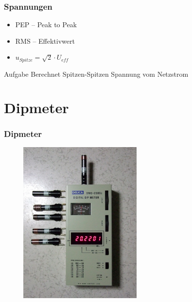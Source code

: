 \begin{frame}
  \frametitle{Spannungen}
  \begin{center}
    \begin{itemize}
      \item PEP -- Peak to Peak
      \item RMS -- Effektivwert
      \item $u_{Spitze} = \sqrt{2} \cdot U_{eff}$ \\
    \end{itemize}
  \end{center}
  \begin{exampleblock}{Aufgabe}
    Berechnet Spitzen-Spitzen Spannung vom Netzstrom
  \end{exampleblock}
\end{frame}

\section*{Dipmeter}

\begin{frame}
  \frametitle{Dipmeter}
  \begin{center}
    \begin{figure}
      \includegraphics[width=0.55\textwidth,height=.75\textheight,keepaspectratio]{e17/Dipmeter.jpg}
    \end{figure}
  \end{center}
\end{frame}

